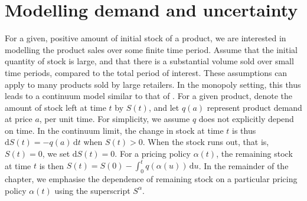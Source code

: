 \documentclass[main.tex]{subfiles}
\begin{document}
\section{Modelling demand and uncertainty}\label{sec:cts_modelling}
For a given, positive amount of initial stock of a product, we are interested in
modelling the product sales over some finite time period.
Assume that the initial quantity of stock is large, and that there is a
substantial volume sold over small time periods, compared to the total
period of interest. These assumptions can apply to many products sold
by large retailers. In the monopoly setting, this thus leads to
a continuum model similar to that of \citet{kalish1983monopolist}.
For a given product, denote the amount of stock left at time $t$ by $S(t)$,
and let $q(a)$ represent product demand at price $a$, per unit
time.
For simplicity, we assume $q$ does not explicitly depend on time.
In the continuum limit, the change in  stock at time $t$
is thus $\mathrm{d}S(t)=-q(a)\,\mathrm{d}t$ when $S(t)>0$. When the
stock runs out, that is, $S(t)=0$, we set $\mathrm{d}S(t)=0$.
For a pricing policy
$\alpha(t)$, the remaining stock at time $t$ is then
$S(t)=S(0)-\int_0^tq(\alpha(u))\,\mathrm{d}u$. In the remainder of the chapter,
we emphasise the dependence of remaining stock on a particular
pricing policy $\alpha(t)$ using the superscript $S^\alpha$.
\end{document}
